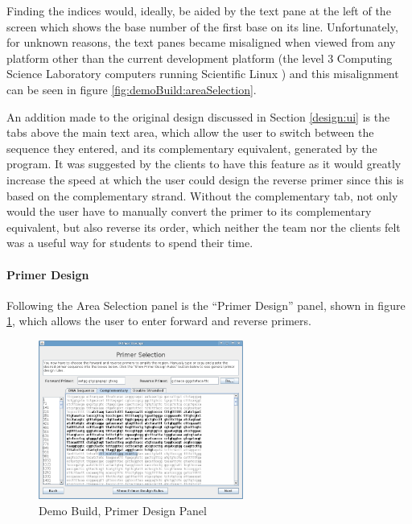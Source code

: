 Finding the indices would, ideally, be aided by the text pane at the 
left of the screen which shows the base number of the first base on its 
line. Unfortunately, for unknown reasons, the text panes became 
misaligned when viewed from any platform other than the current 
development platform (the level 3 Computing Science Laboratory computers
running Scientific Linux \cite{scientificLinux}) and this misalignment
can be seen in figure \ref{fig:demoBuild:areaSelection}.

An addition made to the original design discussed in Section
\ref{design:ui} is the tabs above the main text area, which allow the
user to switch between the sequence they entered, and its
complementary equivalent, generated by the program.
It was suggested by the clients to have this feature as it would
greatly increase the speed at which the user could design the reverse
primer since this is based on the complementary strand.
Without the complementary tab, not only would the user have to
manually convert the primer to its complementary equivalent, but also
reverse its order, which neither the team nor the clients felt was a
useful way for students to spend their time. 


\paragraph{Primer Design}

Following the Area Selection panel is the ``Primer Design'' panel,
shown in figure \ref{fig:demoBuild:primerDesign}, which allows the
user to enter forward and reverse primers.

\begin{figure}[!t]
  \begin{center}
    \includegraphics[width=0.6\textwidth]{./images/demoBuild/primerDesign.png}
    \caption{
      \label{fig:demoBuild:primerDesign}
      Demo Build, Primer Design Panel
    }
  \end{center}
\end{figure}

